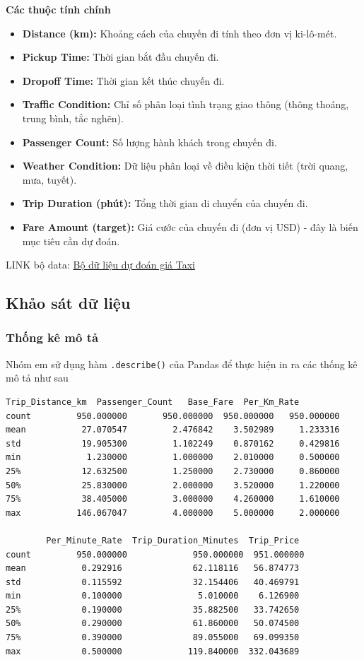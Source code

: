 \textbf{Các thuộc tính chính}
\begin{itemize}
    \item \textbf{Distance (km):} Khoảng cách của chuyến đi tính theo đơn vị ki-lô-mét.
    \item \textbf{Pickup Time:} Thời gian bắt đầu chuyến đi.
    \item \textbf{Dropoff Time:} Thời gian kết thúc chuyến đi.
    \item \textbf{Traffic Condition:} Chỉ số phân loại tình trạng giao thông (thông thoáng, trung bình, tắc nghẽn).
    \item \textbf{Passenger Count:} Số lượng hành khách trong chuyến đi.
    \item \textbf{Weather Condition:} Dữ liệu phân loại về điều kiện thời tiết (trời quang, mưa, tuyết).
    \item \textbf{Trip Duration (phút):} Tổng thời gian di chuyển của chuyến đi.
    \item \textbf{Fare Amount (target):} Giá cước của chuyến đi (đơn vị USD) - đây là biến mục tiêu cần dự đoán.
\end{itemize}

LINK bộ data: \href{https://www.kaggle.com/datasets/denkuznetz/taxi-price-prediction/data}{Bộ dữ liệu dự đoán giá Taxi}

\subsection{Khảo sát dữ liệu} 
\subsubsection*{Thống kê mô tả}
Nhóm em sử dụng hàm \texttt{.describe()} của Pandas để thực hiện in ra các thống kê mô tả như sau

\begin{lstlisting}[caption={Thống kê mô tả bộ dữ liệu dự đoán giá taxi}]
        Trip_Distance_km  Passenger_Count   Base_Fare  Per_Km_Rate   
count         950.000000       950.000000  950.000000   950.000000   
mean           27.070547         2.476842    3.502989     1.233316   
std            19.905300         1.102249    0.870162     0.429816   
min             1.230000         1.000000    2.010000     0.500000   
25%            12.632500         1.250000    2.730000     0.860000   
50%            25.830000         2.000000    3.520000     1.220000   
75%            38.405000         3.000000    4.260000     1.610000   
max           146.067047         4.000000    5.000000     2.000000   

        Per_Minute_Rate  Trip_Duration_Minutes  Trip_Price  
count         950.000000             950.000000  951.000000  
mean           0.292916              62.118116   56.874773  
std            0.115592              32.154406   40.469791  
min            0.100000               5.010000    6.126900  
25%            0.190000              35.882500   33.742650  
50%            0.290000              61.860000   50.074500  
75%            0.390000              89.055000   69.099350  
max            0.500000             119.840000  332.043689
\end{lstlisting}
\newpage
